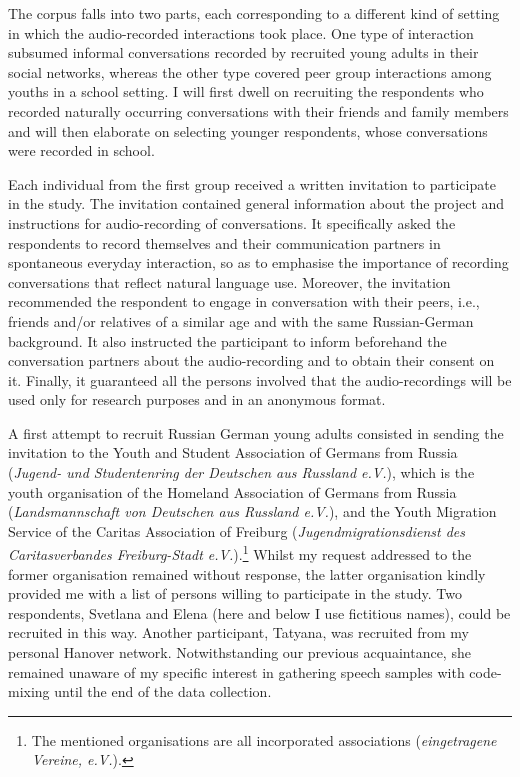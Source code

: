 The corpus falls into two parts, each corresponding to a different kind of setting in which the audio-recorded interactions took place. One type of interaction subsumed informal conversations recorded by recruited young adults in their social networks, whereas the other type covered peer group interactions among youths in a school setting. I will first dwell on recruiting the respondents who recorded naturally occurring conversations with their friends and family members and will then elaborate on selecting younger respondents, whose conversations were recorded in school.

Each individual from the first group received a written invitation to participate in the study. The invitation contained general information about the project and instructions for audio-recording of conversations. It specifically asked the respondents to record themselves and their communication partners in spontaneous everyday interaction, so as to emphasise the importance of recording conversations that reflect natural language use. Moreover, the invitation recommended the respondent to engage in conversation with their peers, i.e., friends and/or relatives of a similar age and with the same Russian-German background. It also instructed the participant to inform beforehand the conversation partners about the audio-recording and to obtain their consent on it. Finally, it guaranteed all the persons involved that the audio-recordings will be used only for research purposes and in an anonymous format.

A first attempt to recruit Russian German young adults consisted in sending the invitation to the Youth and Student Association of Germans from Russia (\textit{Jugend- und Studentenring der Deutschen aus Russland e.V.}), which is the youth organisation of the Homeland Association of Germans from Russia (\textit{Landsmannschaft von Deutschen aus Russland e.V.}), and the Youth Migration Service of the Caritas Association of Freiburg (\textit{Jugendmigrationsdienst des Caritasverbandes Freiburg-Stadt e.V.}).\footnote{The mentioned organisations are all incorporated associations (\textit{eingetragene Vereine, e.V.}).} Whilst my request addressed to the former organisation remained without response, the latter organisation kindly provided me with a list of persons willing to participate in the study. Two respondents, Svetlana and Elena (here and below I use fictitious names), could be recruited in this way. Another participant, Tatyana, was recruited from my personal Hanover network. Notwithstanding our previous acquaintance, she remained unaware of my specific interest in gathering speech samples with code-mixing until the end of the data collection.

